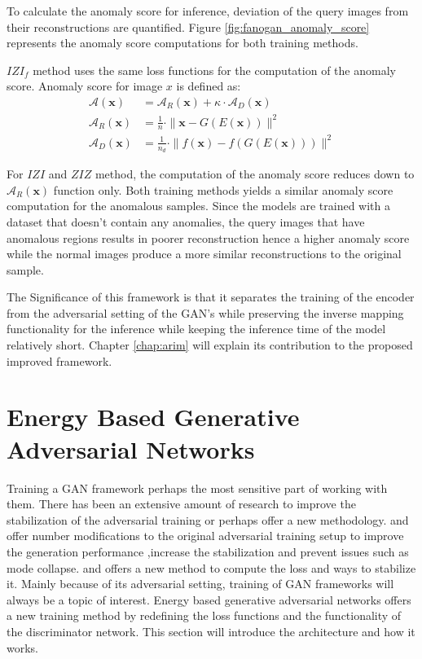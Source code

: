 To calculate the anomaly score for inference, deviation of the query images from their
reconstructions are quantified. Figure \ref{fig:fanogan_anomaly_score} represents the anomaly score
computations for both training methods.

 $IZI_f$ method uses the same loss functions for the computation of the anomaly score. Anomaly score
 for image $x$ is defined as:
\begin{align}
	\mathcal{A}(\mathbf{x})&=\mathcal{A}_{R}(\mathbf{x})+\kappa \cdot \mathcal{A}_{D}(\mathbf{x}) \\[5pt]
	\mathcal{A}_{R}(\mathbf{x})&=\frac{1}{n} \cdot\|\mathbf{x}-G(E(\mathbf{x}))\|^{2} \\[5pt]
	\mathcal{A}_{D}(\mathbf{x})&=\frac{1}{n_{d}} \cdot\|f(\mathbf{x})-f(G(E(\mathbf{x})))\|^{2}
\end{align}

For $IZI$ and $ZIZ$ method, the computation of the anomaly score reduces down to
$\mathcal{A}_{R}(\mathbf{x})$ function only. Both training methods yields a similar anomaly score
computation for the anomalous samples. Since the models are trained with a dataset that doesn't
contain any anomalies, the query images that have anomalous regions results in poorer reconstruction
hence a higher anomaly score while the normal images produce a more similar reconstructions to the
original sample. 

The Significance of this framework is that it separates the training of the encoder from the
adversarial setting of the GAN's while preserving the inverse mapping functionality for the
inference while keeping the inference time of the model relatively short. Chapter 
\ref{chap:arim} will explain its contribution to the proposed improved framework.

\section{Energy Based Generative Adversarial Networks}
\label{sec:ebgan}

Training a GAN framework perhaps the most sensitive part of working with them. There has been an
extensive amount of research to improve the stabilization of the adversarial training or perhaps
offer a new methodology. \cite{fm} and \cite{methods} offer number modifications to the original
adversarial training setup to improve the generation performance ,increase the stabilization and
prevent issues such as mode collapse\footnotemark. \cite{Arjovsky2017WassersteinG} and
\cite{Gulrajani2017ImprovedTO} offers a new method to compute the loss and ways to stabilize it.
Mainly because of its adversarial setting, training of GAN frameworks will always be a topic of
interest. Energy based generative adversarial networks \cite{Zhao2016EnergybasedGA} offers a new
training method by redefining the loss functions and the functionality of the discriminator network.
This section will introduce the architecture and how it works.

